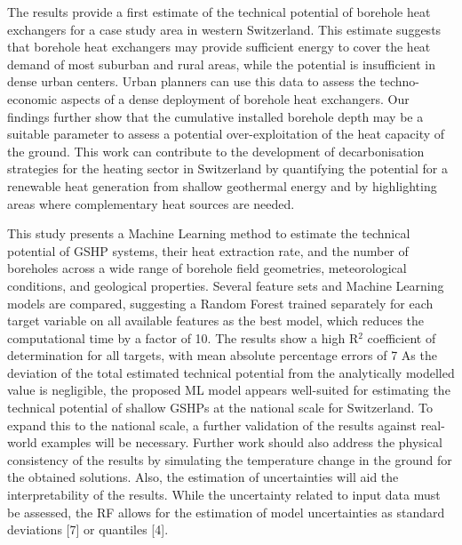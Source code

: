The results provide a first estimate of the technical potential of borehole heat exchangers for a case study area in western Switzerland.
This estimate suggests that borehole heat exchangers may provide sufficient energy to cover the heat demand of most suburban and rural areas, while the potential is insufficient in dense urban centers.
Urban planners can use this data to assess the techno-economic aspects of a dense deployment of borehole heat exchangers.
Our findings further show that the cumulative installed borehole depth may be a suitable parameter to assess a potential over-exploitation of the heat capacity of the ground.
%
This work can contribute to the development of decarbonisation strategies for the heating sector in Switzerland by quantifying the potential for a renewable heat generation from shallow geothermal energy and by highlighting areas where complementary heat sources are needed.


This study presents a Machine Learning method to estimate the technical potential of GSHP systems, their heat extraction rate, and the number of boreholes across a wide range of borehole field geometries, meteorological conditions, and geological properties. Several feature sets and Machine Learning models are compared, suggesting a Random Forest trained separately for each target variable on all available features as the best model, which reduces the computational time by a factor of 10. The results show a high R$^2$ coefficient of determination for all targets, with mean absolute percentage errors of 7%
As the deviation of the total estimated technical potential from the analytically modelled value is negligible, the proposed ML model appears well-suited for estimating the technical potential of shallow GSHPs at the national scale for Switzerland. To expand this to the national scale, a further validation of the results against real-world examples will be necessary. Further work should also address the physical consistency of the results by simulating the temperature change in the ground for the obtained solutions. Also, the estimation of uncertainties will aid the interpretability of the results. While the uncertainty related to input data must be assessed, the RF allows for the estimation of model uncertainties as standard deviations [7] or quantiles [4].
